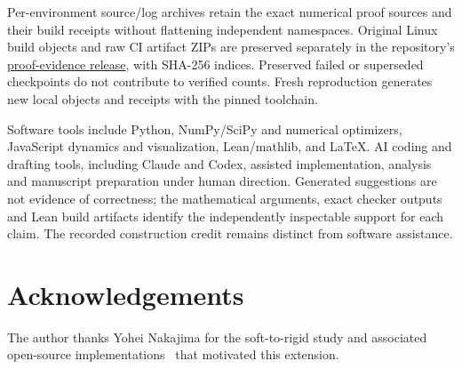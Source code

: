 \documentclass[11pt,a4paper]{article}
\begin{document}
Per-environment source/log archives retain the exact numerical proof sources and their build receipts without flattening independent namespaces. Original Linux build objects and raw CI artifact ZIPs are preserved separately in the repository's \href{https://github.com/alejandrozu/platonic-packing/releases/tag/lean-frozen-catalogue-2026-10-16}{proof-evidence release}, with SHA-256 indices. Preserved failed or superseded checkpoints do not contribute to verified counts. Fresh reproduction generates new local objects and receipts with the pinned toolchain.

Software tools include Python, NumPy/SciPy and numerical optimizers, JavaScript dynamics and visualization, Lean/mathlib, and LaTeX. AI coding and drafting tools, including Claude and Codex, assisted implementation, analysis and manuscript preparation under human direction. Generated suggestions are not evidence of correctness; the mathematical arguments, exact checker outputs and Lean build artifacts identify the independently inspectable support for each claim. The recorded construction credit remains distinct from software assistance.

\section*{Acknowledgements}
The author thanks Yohei Nakajima for the soft-to-rigid study and associated open-source implementations~\cite{nakajima2026} that motivated this extension.
\end{document}
